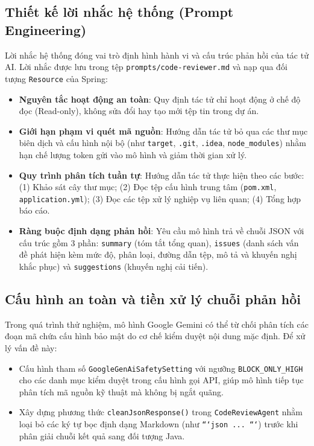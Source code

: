\documentclass[12pt,a4paper]{report}
\begin{document}
\subsection{Thiết kế lời nhắc hệ thống (Prompt Engineering)}
Lời nhắc hệ thống đóng vai trò định hình hành vi và cấu trúc phản hồi của tác tử AI. Lời nhắc được lưu trong tệp \texttt{prompts/code-reviewer.md} và nạp qua đối tượng \texttt{Resource} của Spring:
\begin{itemize}
    \item \textbf{Nguyên tắc hoạt động an toàn}: Quy định tác tử chỉ hoạt động ở chế độ đọc (Read-only), không sửa đổi hay tạo mới tệp tin trong dự án.
    \item \textbf{Giới hạn phạm vi quét mã nguồn}: Hướng dẫn tác tử bỏ qua các thư mục biên dịch và cấu hình nội bộ (như \texttt{target}, \texttt{.git}, \texttt{.idea}, \texttt{node\_modules}) nhằm hạn chế lượng token gửi vào mô hình và giảm thời gian xử lý.
    \item \textbf{Quy trình phân tích tuần tự}: Hướng dẫn tác tử thực hiện theo các bước: (1) Khảo sát cây thư mục; (2) Đọc tệp cấu hình trung tâm (\texttt{pom.xml}, \texttt{application.yml}); (3) Đọc các tệp xử lý nghiệp vụ liên quan; (4) Tổng hợp báo cáo.
    \item \textbf{Ràng buộc định dạng phản hồi}: Yêu cầu mô hình trả về chuỗi JSON với cấu trúc gồm 3 phần: \texttt{summary} (tóm tắt tổng quan), \texttt{issues} (danh sách vấn đề phát hiện kèm mức độ, phân loại, đường dẫn tệp, mô tả và khuyến nghị khắc phục) và \texttt{suggestions} (khuyến nghị cải tiến).
\end{itemize}

\subsection{Cấu hình an toàn và tiền xử lý chuỗi phản hồi}
Trong quá trình thử nghiệm, mô hình Google Gemini có thể từ chối phân tích các đoạn mã chứa cấu hình bảo mật do cơ chế kiểm duyệt nội dung mặc định. Để xử lý vấn đề này:
\begin{itemize}
    \item Cấu hình tham số \texttt{GoogleGenAiSafetySetting} với ngưỡng \texttt{BLOCK\_ONLY\_HIGH} cho các danh mục kiểm duyệt trong cấu hình gọi API, giúp mô hình tiếp tục phân tích mã nguồn kỹ thuật mà không bị ngắt quãng.
    \item Xây dựng phương thức \texttt{cleanJsonResponse()} trong \texttt{CodeReviewAgent} nhằm loại bỏ các ký tự bọc định dạng Markdown (như \texttt{```json ... ```}) trước khi phân giải chuỗi kết quả sang đối tượng Java.
\end{itemize}
\end{document}
